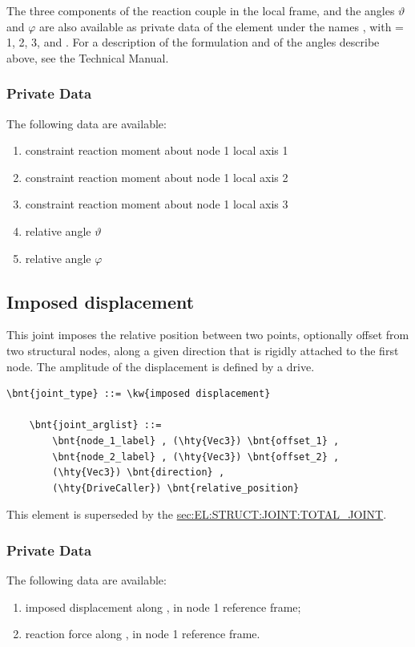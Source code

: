 The three components of the reaction couple in the local frame, 
and the angles $\vartheta$ and $\varphi$ are also available
as private data of the element under the names ,
with  = 1, 2, 3,  and .
For a description of the formulation and of the angles describe above,
see the Technical Manual.

\subsubsection{Private Data}
The following data are available:
\begin{enumerate}
\item {} constraint reaction moment about node 1 local axis 1
\item {} constraint reaction moment about node 1 local axis 2
\item {} constraint reaction moment about node 1 local axis 3
\item {} relative angle $\vartheta$
\item {} relative angle $\varphi$
\end{enumerate}



\subsection{Imposed displacement}
\label{sec:EL:JOINT:IMPOSEDDISPLACEMENT}
This joint imposes the relative position between two points,
optionally offset from two structural nodes,
along a given direction that is rigidly attached to the first node.
The amplitude of the displacement is defined by a drive.
\begin{Verbatim}[commandchars=\\\{\}]
    \bnt{joint_type} ::= \kw{imposed displacement}

    \bnt{joint_arglist} ::= 
        \bnt{node_1_label} , (\hty{Vec3}) \bnt{offset_1} ,
        \bnt{node_2_label} , (\hty{Vec3}) \bnt{offset_2} ,
        (\hty{Vec3}) \bnt{direction} ,
        (\hty{DriveCaller}) \bnt{relative_position}
\end{Verbatim}
This element is superseded by the
\hyperref{\kw{total joint}}{\kw{total joint}, see Section~}{}{sec:EL:STRUCT:JOINT:TOTAL_JOINT}.

\subsubsection{Private Data}
The following data are available:
\begin{enumerate}
\item {} imposed displacement along ,
in node 1 reference frame;
\item {} reaction force along ,
in node 1 reference frame.
\end{enumerate}


